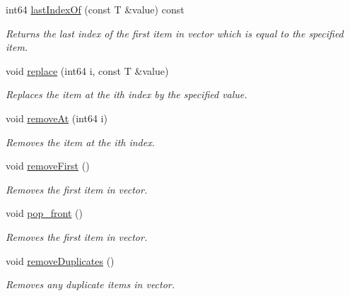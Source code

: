 \begin{DoxyCompactItemize}
int64 \mbox{\hyperlink{class_a_vector_a0136c965390cde0c87fdf65c5ee63b9f}{last\+Index\+Of}} (const T \&value) const
\begin{DoxyCompactList}\small\item\em Returns the last index of the first item in vector which is equal to the specified item. \end{DoxyCompactList}\item 
void \mbox{\hyperlink{class_a_vector_aaa3f52e1356f810f38551cc877e0f32f}{replace}} (int64 i, const T \&value)
\begin{DoxyCompactList}\small\item\em Replaces the item at the ith index by the specified value. \end{DoxyCompactList}\item 
void \mbox{\hyperlink{class_a_vector_a8da18d4cbfe89150ebecec53e2a6f73e}{remove\+At}} (int64 i)
\begin{DoxyCompactList}\small\item\em Removes the item at the ith index. \end{DoxyCompactList}\item 
\mbox{\label{class_a_vector_a020d395a9f706e2791a3c95f4766cfd8}} 
void \mbox{\hyperlink{class_a_vector_a020d395a9f706e2791a3c95f4766cfd8}{remove\+First}} ()
\begin{DoxyCompactList}\small\item\em Removes the first item in vector. \end{DoxyCompactList}\item 
\mbox{\label{class_a_vector_aff3d2534c69c1402f85cda5b5c145356}} 
void \mbox{\hyperlink{class_a_vector_aff3d2534c69c1402f85cda5b5c145356}{pop\+\_\+front}} ()
\begin{DoxyCompactList}\small\item\em Removes the first item in vector. \end{DoxyCompactList}\item 
\mbox{\label{class_a_vector_aa0d05e2719478e74c93f54e8d7cffc6f}} 
void \mbox{\hyperlink{class_a_vector_aa0d05e2719478e74c93f54e8d7cffc6f}{remove\+Duplicates}} ()
\begin{DoxyCompactList}\small\item\em Removes any duplicate items in vector. \end{DoxyCompactList}\item 

\end{DoxyCompactItemize}
